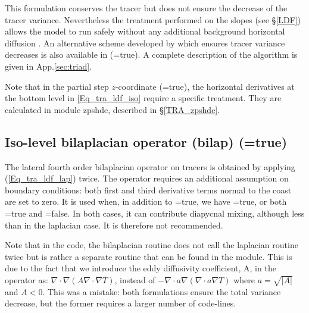\documentclass[NEMO_book]{subfiles}
\begin{document}
This formulation conserves the tracer but does not ensure the decrease 
of the tracer variance. Nevertheless the treatment performed on the slopes 
(see \S\ref{LDF}) allows the model to run safely without any additional 
background horizontal diffusion \citep{Guilyardi_al_CD01}. An alternative scheme 
developed by \cite{Griffies_al_JPO98} which ensures tracer variance decreases 
is also available in \NEMO (=true). A complete description of 
the algorithm is given in App.\ref{sec:triad}.

Note that in the partial step $z$-coordinate (=true), the horizontal 
derivatives at the bottom level in \eqref{Eq_tra_ldf_iso} require a specific 
treatment. They are calculated in module zpshde, described in \S\ref{TRA_zpshde}.

\subsection   [Iso-level bilaplacian operator (bilap) (\np{ln\_traldf\_bilap})]
			{Iso-level bilaplacian operator (bilap) (=true)}
\label{TRA_ldf_bilap}

The lateral fourth order bilaplacian operator on tracers is obtained by 
applying (\ref{Eq_tra_ldf_lap}) twice. The operator requires an additional assumption 
on boundary conditions: both first and third derivative terms normal to the 
coast are set to zero. It is used when, in addition to =true, 
we have =true, or both =true and 
=false. In both cases, it can contribute diapycnal mixing, 
although less than in the laplacian case. It is therefore not recommended.

Note that in the code, the bilaplacian routine does not call the laplacian 
routine twice but is rather a separate routine that can be found in the
 module. This is due to the fact that we introduce the 
eddy diffusivity coefficient, A, in the operator as: 
$\nabla \cdot \nabla \left( {A\nabla \cdot \nabla T} \right)$, 
instead of 
$-\nabla \cdot a\nabla \left( {\nabla \cdot a\nabla T} \right)$ 
where $a=\sqrt{|A|}$ and $A<0$. This was a mistake: both formulations 
ensure the total variance decrease, but the former requires a larger 
number of code-lines.
\end{document}
